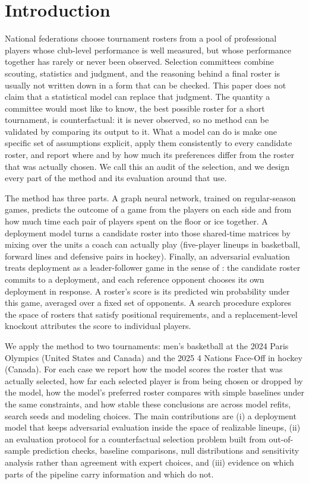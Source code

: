 \section{Introduction}
\label{sec:intro}

National federations choose tournament rosters from a pool of professional players whose club-level performance is well measured, but whose performance together has rarely or never been observed. Selection committees combine scouting, statistics and judgment, and the reasoning behind a final roster is usually not written down in a form that can be checked. This paper does not claim that a statistical model can replace that judgment. The quantity a committee would most like to know, the best possible roster for a short tournament, is counterfactual: it is never observed, so no method can be validated by comparing its output to it. What a model can do is make one specific set of assumptions explicit, apply them consistently to every candidate roster, and report where and by how much its preferences differ from the roster that was actually chosen. We call this an audit of the selection, and we design every part of the method and its evaluation around that use.

The method has three parts. A graph neural network, trained on regular-season games, predicts the outcome of a game from the players on each side and from how much time each pair of players spent on the floor or ice together. A deployment model turns a candidate roster into those shared-time matrices by mixing over the units a coach can actually play (five-player lineups in basketball, forward lines and defensive pairs in hockey). Finally, an adversarial evaluation treats deployment as a leader-follower game in the sense of \citet{conitzer2006}: the candidate roster commits to a deployment, and each reference opponent chooses its own deployment in response. A roster's score is its predicted win probability under this game, averaged over a fixed set of opponents. A search procedure explores the space of rosters that satisfy positional requirements, and a replacement-level knockout attributes the score to individual players.

We apply the method to two tournaments: men's basketball at the 2024 Paris Olympics (United States and Canada) and the 2025 4 Nations Face-Off in hockey (Canada). For each case we report how the model scores the roster that was actually selected, how far each selected player is from being chosen or dropped by the model, how the model's preferred roster compares with simple baselines under the same constraints, and how stable these conclusions are across model refits, search seeds and modeling choices. The main contributions are (i) a deployment model that keeps adversarial evaluation inside the space of realizable lineups, (ii) an evaluation protocol for a counterfactual selection problem built from out-of-sample prediction checks, baseline comparisons, null distributions and sensitivity analysis rather than agreement with expert choices, and (iii) evidence on which parts of the pipeline carry information and which do not.

